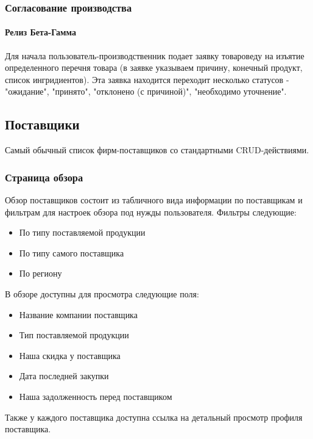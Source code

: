 \documentclass[DIV=calc, paper=a4, fontsize=11pt]{scrartcl} %
\begin{document}
\subsubsection{Согласование производства}

\paragraph{Релиз Бета-Гамма}
Для начала пользователь-производственник подает заявку товароведу на изъятие определенного перечня товара (в заявке указываем причину, конечный продукт, список ингридиентов). Эта заявка находится переходит несколько статусов - "ожидание", "принято", "отклонено (с причиной)", "необходимо уточнение".

\subsection{Поставщики}

Самый обычный список фирм-поставщиков со стандартными CRUD-действиями.

\subsubsection{Страница обзора}

Обзор поставщиков состоит из табличного вида информации по поставщикам и фильтрам для настроек обзора под нужды пользователя. Фильтры следующие:

\begin{itemize}
	\item По типу поставляемой продукции
	\item По типу самого поставщика 
	\item По региону
\end{itemize}

В обзоре доступны для просмотра следующие поля:

\begin{itemize}
	\item Название компании поставщика
	\item Тип поставляемой продукции
	\item Наша скидка у поставщика
	\item Дата последней закупки
	\item Наша задолженность перед поставщиком
\end{itemize}

Также у каждого поставщика доступна ссылка на детальный просмотр профиля поставщика.
\end{document}
